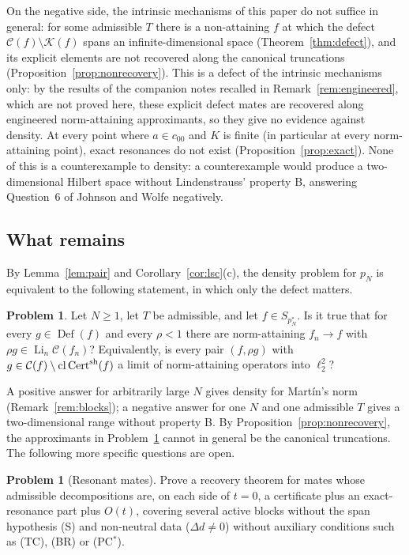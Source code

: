 \documentclass[10pt]{amsart}
\theoremstyle{definition}
\newtheorem{problem}[theorem]{Problem}
\theoremstyle{remark}
\newcommand{\Cset}{\mathcal C}
\newcommand{\Cert}{\operatorname{Cert}}
\newcommand{\Li}{\operatorname*{Li}}
\newcommand{\cl}{\operatorname{cl}}
\newcommand{\Def}{\operatorname{Def}}
\begin{document}
On the negative side, the intrinsic mechanisms of this paper do not suffice
in general: for some admissible $T$ there is a non-attaining $f$ at which the
defect $\Cset(f)\setminus\mathcal K(f)$ spans an infinite-dimensional space
(Theorem~\ref{thm:defect}), and its explicit elements are not recovered along
the canonical truncations (Proposition~\ref{prop:nonrecovery}).  This is a
defect of the intrinsic mechanisms only: by the results of the companion
notes recalled in Remark~\ref{rem:engineered}, which are not proved here,
these explicit defect mates are recovered along engineered norm-attaining
approximants, so they give no evidence against density.  At every point
where $a\in c_{00}$ and $K$ is finite (in particular at every norm-attaining
point), exact resonances do not exist (Proposition~\ref{prop:exact}).  None
of this is a counterexample to density: a counterexample would produce a
two-dimensional Hilbert space without Lindenstrauss' property B, answering
Question~6 of Johnson and Wolfe \cite{JW} negatively.

\subsection{What remains}
By Lemma~\ref{lem:pair} and Corollary~\ref{cor:lsc}(c), the density problem
for $p_N$ is equivalent to the following statement, in which only the defect
matters.

\begin{problem}\label{prob:main}
Let $N\ge1$, let $T$ be admissible, and let $f\in S_{p_N^*}$.  Is it true
that for every $g\in\Def(f)$ and every $\rho<1$ there are norm-attaining
$f_n\to f$ with $\rho g\in\Li_n\Cset(f_n)$?  Equivalently, is every pair
$(f,\rho g)$ with $g\in\Cset(f)\setminus\cl\Cert^{\rm sh}(f)$ a limit of
norm-attaining operators into $\ell_2^2$?
\end{problem}

A positive answer for arbitrarily large $N$ gives density for Mart\'in's
norm (Remark~\ref{rem:blocks}); a negative answer for one $N$ and one
admissible $T$ gives a two-dimensional range without property B.  By
Proposition~\ref{prop:nonrecovery}, the approximants in
Problem~\ref{prob:main} cannot in general be the canonical truncations.
The following more specific questions are open.

\begin{problem}[Resonant mates]\label{prob:resonant}
Prove a recovery theorem for mates whose admissible decompositions are, on
each side of $t=0$, a certificate plus an exact-resonance part plus $O(t)$,
covering several active blocks without the span hypothesis \textup{(S)} and
non-neutral data \textup{(}$\Delta d\ne0$\textup{)} without auxiliary
conditions such as \textup{(TC)}, \textup{(BR)} or \textup{(PC$^*$)}.
\end{problem}
\end{document}
